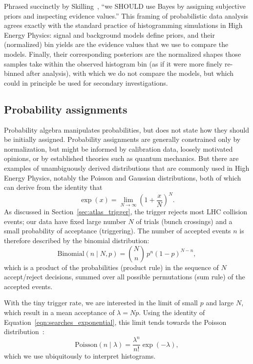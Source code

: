 Phrased succinctly by Skilling~\cite{skilling2008rant},
``we SHOULD use Bayes by assigning subjective priors and inspecting evidence
values.''
This framing of probabilistic data analysis agrees exactly with the standard
practice of histogramming simulations in High Energy Physics:
signal and background models define priors, and their (normalized) bin yields
are the evidence values that we use to compare the models.
Finally, their corresponding posteriors are the normalized shapes those samples
take within the observed histogram bin
(as if it were more finely re-binned after analysis),
with which we do not compare the models,
but which could in principle be used for secondary investigations.


\subsection{Probability assignments}
Probability algebra manipulates probabilities, but does not state how they
should be initially assigned.
Probability assignments are generally constrained only by normalization, but
might be informed by calibration data, loosely motivated opinions,
or by established theories such as quantum mechanics.
But there are examples of unambiguously derived distributions that are commonly
used in High Energy Physics, notably the Poisson and Gaussian distributions,
both of which can derive from the identity that
\begin{equation}
\label{eqn:searches_exponential}
\exp(x) =
\lim_{N \to \infty}\!
\left(1 + \frac{x}{N}\right)^N
.
\end{equation}
As discussed in Section~\ref{sec:atlas_trigger}, the trigger rejects most
LHC collision events;
our data have fixed large number $N$ of trials (bunch crossings)
and a small probability of acceptance (triggering).
The number of accepted events  $n$ is therefore described by the
binomial distribution:
\begin{equation}
\label{eqn:searches_binomial}
\mathrm{Binomial}(n\mid N, p) = \binom{N}{n}\, p^n (1 - p)^{N - n}
,
\end{equation}
which is a product of the probabilities (product rule) in the sequence of $N$
accept/reject decisions, summed over all possible permutations (sum rule) of
the accepted events.

With the tiny trigger rate, we are interested in the limit of small
$p$ and large $N$, which result in a mean acceptance of $\lambda = Np$.
Using the identity of Equation~\ref{eqn:searches_exponential},
this limit tends towards the Poisson distribution~\cite{jaynes2003probability}:
\begin{equation}
\label{eqn:searches_poisson}
\mathrm{Poisson}(n\mid \lambda) = \frac{\lambda^n}{n!}\exp(-\lambda)
,
\end{equation}
which we use ubiquitously to interpret histograms.

